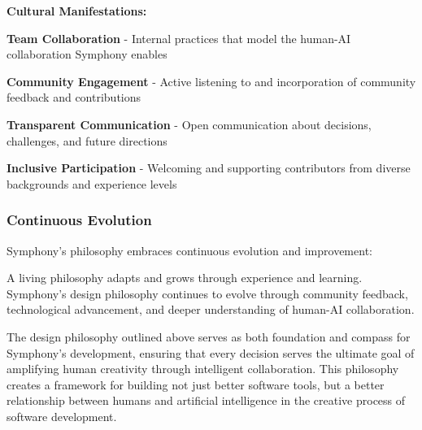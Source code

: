 \textbf{Cultural Manifestations:}

\begin{expandedlist}
    \item \textbf{Team Collaboration} - Internal practices that model the human-AI collaboration Symphony enables
    
    \item \textbf{Community Engagement} - Active listening to and incorporation of community feedback and contributions
    
    \item \textbf{Transparent Communication} - Open communication about decisions, challenges, and future directions
    
    \item \textbf{Inclusive Participation} - Welcoming and supporting contributors from diverse backgrounds and experience levels
\end{expandedlist}

\subsubsection{Continuous Evolution}

Symphony's philosophy embraces continuous evolution and improvement:

\begin{successbox}
A living philosophy adapts and grows through experience and learning. Symphony's design philosophy continues to evolve through community feedback, technological advancement, and deeper understanding of human-AI collaboration.
\end{successbox}

The design philosophy outlined above serves as both foundation and compass for Symphony's development, ensuring that every decision serves the ultimate goal of amplifying human creativity through intelligent collaboration. This philosophy creates a framework for building not just better software tools, but a better relationship between humans and artificial intelligence in the creative process of software development.
